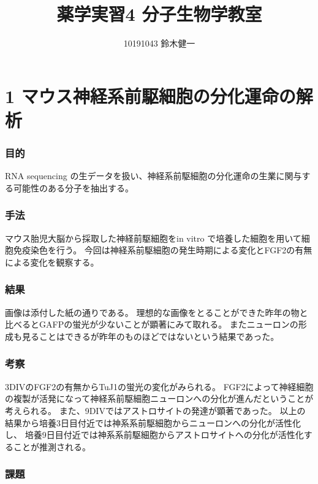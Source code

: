 \documentclass[a4paper,papersize,dvipdfmx]{jsarticle}
\begin{document}
\title{薬学実習4 分子生物学教室}
\author{10191043 鈴木健一}
\date{}
\maketitle



\part*{1 マウス神経系前駆細胞の分化運命の解析}

\section*{目的}
RNA sequencing の生データを扱い、神経系前駆細胞の分化運命の生業に関与する可能性のある分子を抽出する。

\section*{手法}
マウス胎児大脳から採取した神経前駆細胞をin vitro で培養した細胞を用いて細胞免疫染色を行う。
今回は神経系前駆細胞の発生時期による変化とFGF2の有無による変化を観察する。


\section*{結果}
画像は添付した紙の通りである。
理想的な画像をとることができた昨年の物と比べるとGAFPの蛍光が少ないことが顕著にみて取れる。
またニューロンの形成も見ることはできるが昨年のものほどではないという結果であった。

\section*{考察}
3DIVのFGF2の有無からTuJ1の蛍光の変化がみられる。
FGF2によって神経細胞の複製が活発になって神経系前駆細胞ニューロンへの分化が進んだということが考えられる。
また、9DIVではアストロサイトの発達が顕著であった。
以上の結果から培養3日目付近では神系系前駆細胞からニューロンへの分化が活性化し、
培養9日目付近では神系系前駆細胞からアストロサイトへの分化が活性化することが推測される。


\section*{課題}
\end{document}
